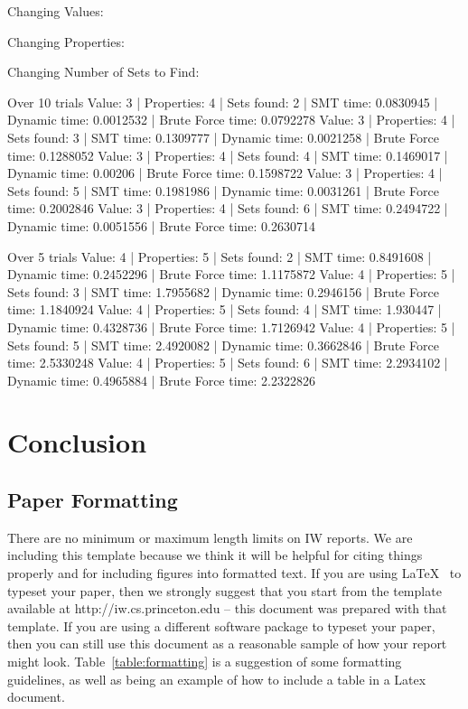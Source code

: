 \documentclass[pageno]{jpaper}
\begin{document}
Changing Values:


Changing Properties:




Changing Number of Sets to Find:

Over 10 trials
Value: 3 | Properties: 4 | Sets found: 2 | SMT time: 0.0830945 | Dynamic time: 0.0012532 | Brute Force time: 0.0792278
Value: 3 | Properties: 4 | Sets found: 3 | SMT time: 0.1309777 | Dynamic time: 0.0021258 | Brute Force time: 0.1288052
Value: 3 | Properties: 4 | Sets found: 4 | SMT time: 0.1469017 | Dynamic time: 0.00206 | Brute Force time: 0.1598722
Value: 3 | Properties: 4 | Sets found: 5 | SMT time: 0.1981986 | Dynamic time: 0.0031261 | Brute Force time: 0.2002846
Value: 3 | Properties: 4 | Sets found: 6 | SMT time: 0.2494722 | Dynamic time: 0.0051556 | Brute Force time: 0.2630714

Over 5 trials
Value: 4 | Properties: 5 | Sets found: 2 | SMT time: 0.8491608 | Dynamic time: 0.2452296 | Brute Force time: 1.1175872
Value: 4 | Properties: 5 | Sets found: 3 | SMT time: 1.7955682 | Dynamic time: 0.2946156 | Brute Force time: 1.1840924
Value: 4 | Properties: 5 | Sets found: 4 | SMT time: 1.930447 | Dynamic time: 0.4328736 | Brute Force time: 1.7126942
Value: 4 | Properties: 5 | Sets found: 5 | SMT time: 2.4920082 | Dynamic time: 0.3662846 | Brute Force time: 2.5330248
Value: 4 | Properties: 5 | Sets found: 6 | SMT time: 2.2934102 | Dynamic time: 0.4965884 | Brute Force time: 2.2322826

\section{Conclusion}









\subsection{Paper Formatting}
\label{section:formatting}

There are no minimum or maximum length limits on IW reports.  
We are including this template because we think it will be helpful
for citing things properly and for including figures into formatted
text.  If you are using \LaTeX~\cite{lamport94} 
to typeset your paper, then we strongly suggest
that you start from the template available at
http://iw.cs.princeton.edu -- this
document was prepared with that template.  
If you are using a different software package to typeset your paper, 
then you can still use this document as a reasonable sample of 
how your report might look.  Table~\ref{table:formatting} is a suggestion
of some formatting guidelines, as well as being an example of how to
include a table in a Latex document.
\end{document}
